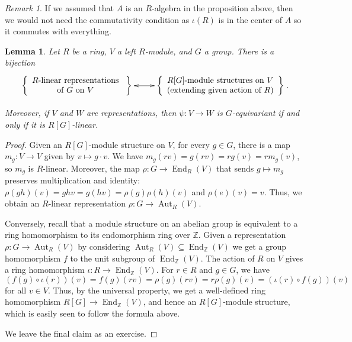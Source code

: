 \documentclass{amsart}[12pt]
\def\Aut{\operatorname{Aut}}
\def\End{\operatorname{End}}
\newcommand{\Z}{\mathbb{Z}}
\numberwithin{equation}{section}
\theoremstyle{plain} %
\newtheorem{lem}[equation]{Lemma}
\theoremstyle{definition}
\theoremstyle{remark}
\newtheorem{rem}[equation]{Remark}
\begin{document}
\begin{rem}
If we assumed that $A$ is an $R$-algebra in the proposition above, then we would not need the commutativity condition as $\iota(R)$ is in the center of $A$ so it commutes with everything.
\end{rem}


\begin{lem} 
\label{lem:repsmods}
Let $R$ be a ring, $V$ a left $R$-module, and $G$ a group.
There is a bijection
$$\xymatrix@R=.4em{ \left\{{\begin{array}{c} \textrm{$R$-linear representations} \\ \textrm{of $G$ on $V$} \end{array} }\ \right\} \ar@{<->}[r] & \left\{ { \begin{array}{c}  R[G]\text{-module structures on $V$} \\ \text{(extending given action of $R$)} \end{array} } \right\} }.
$$

Moreover, if $V$ and $W$ are representations, then $\psi:V\to W$ is $G$-equivariant if and only if it is $R[G]$-linear.
\end{lem}
\begin{proof}
Given an $R[G]$-module structure on $V$, for every $g\in G$, there is a map $m_g: V\to V$ given by $v\mapsto g\cdot v$. We have $m_g  (rv) = g (rv) = rg (v) = r m_g(v)$, so $m_g$ is $R$-linear. Moreover, the map $\rho:G\to \End_R(V)$ that sends $g\mapsto m_g$ preserves multiplication and identity: $\rho(gh)(v) = gh v = g(hv) = \rho(g) \rho(h) (v)$ and $\rho(e)(v) = v$. Thus, we obtain an $R$-linear representation $\rho:G\to \Aut_R(V)$.


Conversely, recall that a module structure on an abelian group is equivalent to a ring homomorphism to its endomorphism ring over $\Z$. Given a representation $\rho:G\to \Aut_R(V)$ by considering $\Aut_R(V)\subseteq \End_\Z(V)$ we get a group homomorphism $f$ to the unit subgroup of $\End_\Z(V)$. The action of $R$ on $V$ gives a ring homomorphism $\iota: R \to \End_\Z(V)$. For $r\in R$ and $g\in G$, we have 
\[ (f(g) \circ \iota(r))(v) = f(g)(rv) = \rho(g)(rv) = r \rho(g)(v) = (\iota(r) \circ f(g))(v)\]
for all $v\in V$. Thus, by the universal property, we get a well-defined ring homomorphism $R[G] \to \End_\Z(V)$, and hence an $R[G]$-module structure, which is easily seen to follow the formula above.

We leave the final claim as an exercise.
\end{proof}
\end{document}
